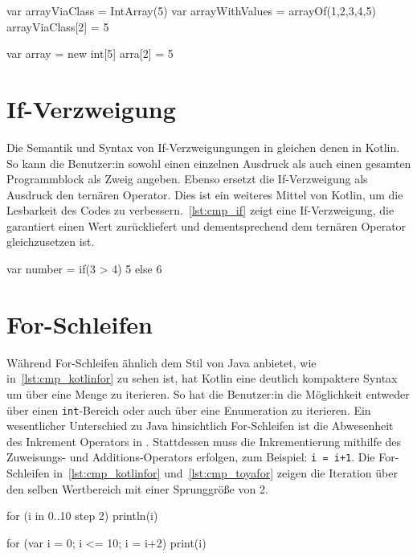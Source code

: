 \begin{KotlinCode}[numbers=none, caption={Felder in Kotlin}, label=lst:cmp_kotlinarrays]
var arrayViaClass = IntArray(5)
var arrayWithValues = arrayOf(1,2,3,4,5)
arrayViaClass[2] = 5
\end{KotlinCode}

\begin{ToyaCode}[numbers=none, caption={Felder in \toya}, label=lst:cmp_toyaarrays]
var array = new int[5]
arra[2] = 5
\end{ToyaCode}

\section{If-Verzweigung}

Die Semantik und Syntax von If-Verzweigungungen in \toya gleichen denen in Kotlin. So kann die Benutzer:in sowohl einen einzelnen Ausdruck als auch einen gesamten Programmblock als Zweig angeben. Ebenso ersetzt die If-Verzweigung als Ausdruck den ternären Operator. Dies ist ein weiteres Mittel von Kotlin, um die Lesbarkeit des Codes zu verbessern.~\autoref{lst:cmp_if} zeigt eine If-Verzweigung, die garantiert einen Wert zurückliefert und dementsprechend dem ternären Operator gleichzusetzen ist.

\begin{KotlinCode}[numbers=none, caption={If-Ausdruck, der sowohl in Kotlin, als auch in \toya übersetzt}, label=lst:cmp_if]
var number = if(3 > 4) 5 else 6
\end{KotlinCode}

\section{For-Schleifen}

Während \toya For-Schleifen ähnlich dem Stil von Java anbietet, wie in~\autoref{lst:cmp_kotlinfor} zu sehen ist, hat Kotlin eine deutlich kompaktere Syntax um über eine Menge zu iterieren. So hat die Benutzer:in die Möglichkeit entweder über einen \texttt{int}-Bereich oder auch über eine Enumeration zu iterieren. Ein wesentlicher Unterschied zu Java hinsichtlich For-Schleifen ist die Abwesenheit des Inkrement Operators in \toya. Stattdessen muss die Inkrementierung mithilfe des Zuweisungs- und Additions-Operators erfolgen, zum Beispiel: \texttt{i = i+1}. Die For-Schleifen in~\autoref{lst:cmp_kotlinfor} und~\autoref{lst:cmp_toyafor} zeigen die Iteration über den selben Wertbereich mit einer Sprunggröße von 2.

\begin{KotlinCode}[numbers=none, caption={Einfache For-Schleife in Kotlin}, label=lst:cmp_kotlinfor]
for (i in 0..10 step 2) {
    println(i)
}
\end{KotlinCode}

\begin{ToyaCode}[numbers=none, caption={Einfache For-Schleife in toya}, label=lst:cmp_toyafor]
for (var i = 0; i <= 10; i = i+2) {
    print(i)
}
\end{ToyaCode}